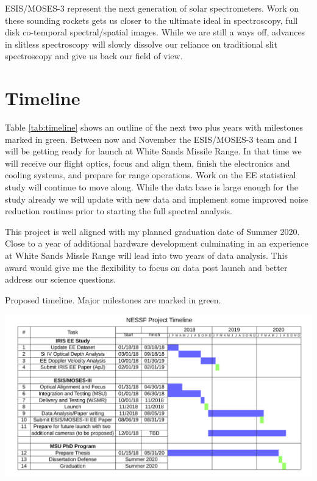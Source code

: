 \documentclass[]{aastex6}
\begin{document}
ESIS/MOSES-3 represent the next generation of solar spectrometers.  Work on these sounding rockets gets us closer to the ultimate ideal in spectroscopy, full disk co-temporal spectral/spatial images.  While we are still a ways off, advances in slitless spectroscopy will slowly dissolve our reliance on traditional slit spectroscopy and give us back our field of view.



 
\section{Timeline}
Table \ref{tab:timeline} shows an outline of the next two plus years with milestones marked in green. Between now and November the ESIS/MOSES-3 team and I will be getting ready for launch at White Sands Missile Range.  In that time we will receive our flight optics, focus and align them, finish the electronics and cooling systems, and prepare for range operations.  Work on the EE statistical study will continue to move along.  While the data base is large enough for the study already we will update with new data and implement some improved noise reduction routines prior to starting the full spectral analysis.  

This project is well aligned with my planned graduation date of Summer 2020.  Close to a year of additional hardware development culminating in an experience at White Sands Missle Range will lead into two years of data analysis.  This award would give me the flexibility to focus on data post launch and better address our science questions.  






\begin{table}[b]
	\caption{Proposed timeline.  Major milestones are marked in green.}
	\centerline{\includegraphics[scale=1]{NESSF2018_Timeline_Cropped.pdf}}
	\label{tab:timeline}
	
\end{table}	
	
\end{document}
